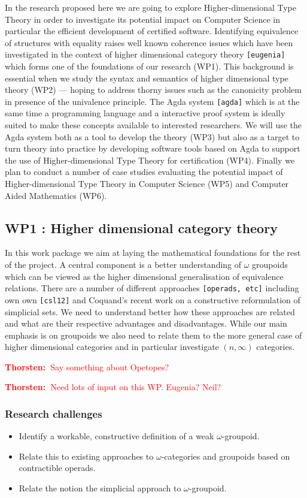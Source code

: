 \documentclass[twocolumn,a4paper]{article}
\newcommand{\txa}[1]{\textcolor{red}{\textbf{Thorsten:~}#1}}
\renewcommand{\cite}[1]{{\tt[#1]}}
\begin{document}
In the research proposed here we are going to explore
Higher-dimensional Type Theory in order to investigate its potential
impact on Computer Science in particular the efficient development of
certified software. Identifying equivalence of structures with
equality raises well known coherence issues which have been
investigated in the context of higher dimensional category theory
\cite{eugenia} which forms one of the foundations of our research
(WP1). This background is essential when we study the syntax and
semantics of higher dimensional type theory (WP2) --- hoping to
address thorny issues such as the canonicity problem in presence of
the univalence principle. The Agda system \cite{agda}
which is at the same time a programming language and a interactive
proof system is ideally suited to make these concepts available to
interested researchers. We will use the Agda system both as a tool to
develop the theory (WP3) but also as a target to turn theory into
practice by developing software tools based on Agda to support the use
of Higher-dimensional Type Theory for certification (WP4). Finally we
plan to conduct a number of case studies evaluating the potential
impact of Higher-dimensional Type Theory in Computer Science (WP5) and
Computer Aided Mathematics (WP6).

\subsection*{WP1 : Higher dimensional category theory}
\label{sec:wp:qio}

In this work package we aim at laying the mathematical foundations for
the rest of the project. A central component is a better understanding
of $\omega$ groupoids which can be viewed as the higher dimensional
generalisation of equivalence relations. There are a number of
different approaches \cite{operads, etc} including own own
\cite{csl12} and Coquand's recent work on a constructive reformulation
of simplicial sets. We need to understand better how these approaches
are related and what are their respective advantages and
disadvantages. While our main emphasis is on groupoids we also need to
relate them to the more general case of higher dimensional categories
and in particular investigate $(n,\infty)$ categories.

\txa{Say something about Opetopes?}

\txa{Need lots of input on this WP. Eugenia? Neil?}

\subsubsection*{Research challenges}
\label{sec:rsearch-challenges}
\begin{itemize}
\item Identify a workable, constructive definition of a weak
$\omega$-groupoid.
\item Relate this to existing approaches to $\omega$-categories and
  groupoids based on contractible operads.
\item Relate the notion the simplicial approach to $\omega$-groupoid.
\end{itemize}
\end{document}
